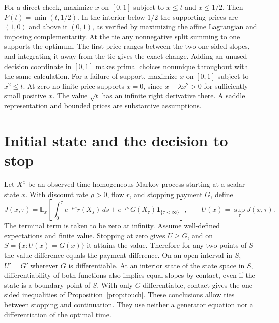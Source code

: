\documentclass[11pt]{article}
\begin{document}
For a direct check, maximize $x$ on $[0,1]$ subject to $x\le t$ and $x\le1/2$. Then $P(t)=\min(t,1/2)$. In the interior below $1/2$ the supporting prices are $(1,0)$ and above it $(0,1)$, as verified by maximizing the affine Lagrangian and imposing complementarity. At the tie any nonnegative split summing to one supports the optimum. The first price ranges between the two one-sided slopes, and integrating it away from the tie gives the exact change. Adding an unused decision coordinate in $[0,1]$ makes primal choices nonunique throughout with the same calculation. For a failure of support, maximize $x$ on $[0,1]$ subject to $x^2\le t$. At zero no finite price supports $x=0$, since $x-\lambda x^2>0$ for sufficiently small positive $x$. The value $\sqrt t$ has an infinite right derivative there. A saddle representation and bounded prices are substantive assumptions.

\section{Initial state and the decision to stop}\label{sec:stop}

Let $X^x$ be an observed time-homogeneous Markov process starting at a scalar state $x$. With discount rate $\rho>0$, flow $r$, and stopping payment $G$, define
\[
 J(x,\tau)=\mathbb E_x\!\left[\int_0^\tau e^{-\rho s}r(X_s)\,ds+
 e^{-\rho\tau}G(X_\tau)\mathbf 1_{\{\tau<\infty\}}\right],
 \qquad U(x)=\sup_\tau J(x,\tau).
\]
The terminal term is taken to be zero at infinity. Assume well-defined expectations and finite value. Stopping at zero gives $U\ge G$, and on $S=\{x:U(x)=G(x)\}$ it attains the value. Therefore for any two points of $S$ the value difference equals the payment difference. On an open interval in $S$, $U'=G'$ wherever $G$ is differentiable. At an interior state of the state space in $S$, differentiability of both functions also implies equal slopes by contact, even if the state is a boundary point of $S$. With only $G$ differentiable, contact gives the one-sided inequalities of Proposition~\ref{prop:touch}. These conclusions allow ties between stopping and continuation. They use neither a generator equation nor a differentiation of the optimal time.
\end{document}
